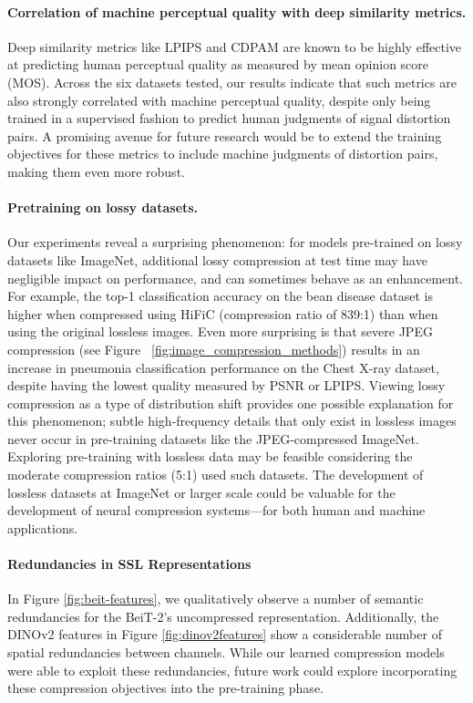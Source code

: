 \documentclass[10pt,twocolumn,letterpaper]{article}
\begin{document}
\paragraph{Correlation of machine perceptual quality with deep similarity metrics.} Deep similarity metrics like LPIPS and CDPAM are known to be highly effective at predicting human perceptual quality as measured by mean opinion score (MOS). Across the six datasets tested, our results indicate that such metrics are also strongly correlated with machine perceptual quality, despite only being trained in a supervised fashion to predict human judgments of signal distortion pairs. A promising avenue for future research would be to extend the training objectives for these metrics to include machine judgments of distortion pairs, making them even more robust.

\paragraph{Pretraining on lossy datasets.} Our experiments reveal a surprising phenomenon: for models pre-trained on lossy datasets like ImageNet, additional lossy compression at test time may have negligible impact on performance, and can sometimes behave as an enhancement. For example, the top-1 classification accuracy on the bean disease dataset is higher when compressed using HiFiC (compression ratio of 839:1) than when using the original lossless images. Even more surprising is that severe JPEG compression (see Figure ~\ref{fig:image_compression_methods}) results in an increase in pneumonia classification performance on the Chest X-ray dataset, despite having the lowest quality measured by PSNR or LPIPS. Viewing lossy compression as a type of distribution shift provides one possible explanation for this phenomenon; subtle high-frequency details that only exist in lossless images never occur in pre-training datasets like the JPEG-compressed ImageNet. Exploring pre-training with lossless data may be feasible considering the moderate compression ratios (5:1) used such datasets. The development of lossless datasets at ImageNet or larger scale could be valuable for the development of neural compression systems---for both human and machine applications.  

\paragraph{Redundancies in SSL Representations}

In Figure \ref{fig:beit-features}, we qualitatively observe a number of semantic redundancies for the BeiT-2's uncompressed representation. Additionally, the DINOv2 features in Figure \ref{fig:dinov2features} show a considerable number of spatial redundancies between channels. While our learned compression models were able to exploit these redundancies, future work could explore incorporating these compression objectives into the pre-training phase.
\end{document}
